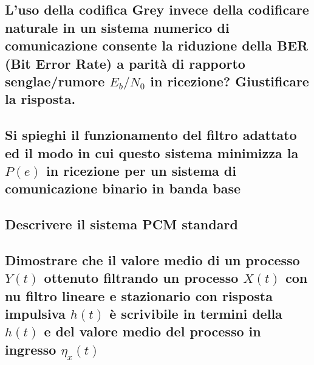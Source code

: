 \documentclass[12pt,oneside,openany]{memoir}
\numberwithin{equation}{subsection}
\begin{document}
\subsection{L'uso della codifica Grey invece della codificare naturale in un
sistema numerico di comunicazione consente la riduzione della BER (Bit Error
Rate) a parit\`a di rapporto senglae/rumore $E_b/N_0$ in ricezione? Giustificare
la risposta.}


\subsection{Si spieghi il funzionamento del filtro adattato ed il modo in cui
questo sistema minimizza la $P(e)$ in ricezione per un sistema di comunicazione
binario in banda base}


\subsection{Descrivere il sistema PCM standard}


\subsection{Dimostrare che il valore medio di un processo $Y(t)$ ottenuto
filtrando un processo $X(t)$ con nu filtro lineare e stazionario con risposta
impulsiva $h(t)$ \`e scrivibile in termini della $h(t)$ e del valore medio del
processo in ingresso $\eta_x(t)$}
\end{document}
